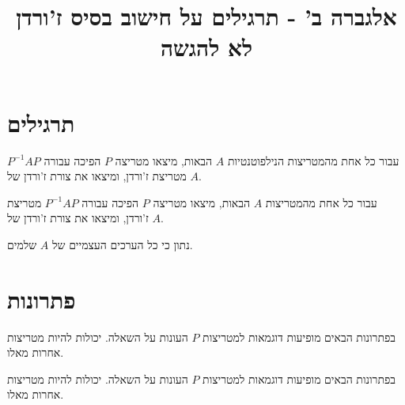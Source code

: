 \documentclass[a4paper,10pt,twoside,openany]{article}
\title{
אלגברה ב' - תרגילים על חישוב בסיס ז'ורדן \\
\vspace{1cm}
\large{לא להגשה}
}
\date{}
\begin{document}
\maketitle

\section*{תרגילים}

\begin{exercise}
עבור כל אחת מהמטריצות הנילפוטנטיות
$A$
הבאות, מיצאו מטריצה
$P$
הפיכה עבורה
$P^{-1} A P$
מטריצת ז'ורדן, ומיצאו את צורת ז'ורדן של
$A$.


\end{exercise}

\begin{exercise}
עבור כל אחת מהמטריצות
$A$
הבאות, מיצאו מטריצה
$P$
הפיכה עבורה
$P^{-1} A P$
מטריצת ז'ורדן, ומיצאו את צורת ז'ורדן של
$A$.

נתון כי כל הערכים העצמיים של
$A$
שלמים.


\end{exercise}

\section*{פתרונות}

\begin{solution}[תרגיל 1]
בפתרונות הבאים מופיעות דוגמאות למטריצות
$P$
העונות על השאלה. יכולות להיות מטריצות אחרות מאלו.


\end{solution}

\begin{solution}[תרגיל 2]
בפתרונות הבאים מופיעות דוגמאות למטריצות
$P$
העונות על השאלה. יכולות להיות מטריצות אחרות מאלו.


\end{solution}
\end{document}
